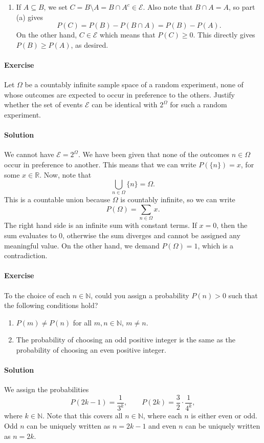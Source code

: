 \documentclass[10pt]{article}
\newcounter{prob}
\def\problem{\stepcounter{prob}\paragraph{Exercise \arabic{prob}}}
\def\solution{\paragraph{Solution}}
\begin{document}
\begin{enumerate}
                \item If $A \subseteq B$, we set $C = B \setminus A = B \cap A^c \in
                \mathcal{E}$.
                Also note that $B \cap A = A$, so part (a) gives \[
                        P(C) = P(B) - P(B \cap A) = P(B) - P(A).
                \] 
                On the other hand, $C \in \mathcal{E}$ which means that $P(C) \geq
                0$. This directly gives $P(B) \geq P(A)$, as desired.

        \end{enumerate}

        \problem Let $\Omega$ be a countably infinite sample space of a random
        experiment, none of whose outcomes are expected to occur in preference to
        the others. Justify whether the set of events $\mathcal{E}$ can be identical
        with $2^\Omega$ for such a random experiment.
        \solution We cannot have $\mathcal{E} = 2^\Omega$. We have been given that
        none of the outcomes $n \in \Omega$ occur in preference to another.
        This means that we can write $P(\{n\}) = x$, for some $x \in \mathbb{R}$.
        Now, note that \[
                \bigcup_{n \in \Omega} \{n\} = \Omega.
        \] This is a countable union because $\Omega$ is countably infinite, so we
        can write \[
                P(\Omega) = \sum_{n \in \Omega} x.
        \] The right hand side is an infinite sum with constant terms. If $x = 0$,
        then the sum evaluates to $0$, otherwise the sum diverges and cannot be
        assigned any meaningful value. On the other hand, we demand $P(\Omega) = 1$,
        which is a contradiction.

        \problem To the choice of each $n \in \mathbb{N}$, could you assign a 
        probability $P(n) > 0$ such that the following conditions hold?
        \begin{enumerate}
                \item $P(m) \neq P(n)$ for all $m, n \in \mathbb{N}$, $m \neq n$.
                \item The probability of choosing an odd positive integer is the
                same as the probability of choosing an even positive integer.
        \end{enumerate}
        \solution We assign the probabilities \[
                P(2k - 1) = \frac{1}{3^k}, \qquad 
                P(2k) = \frac{3}{2}\cdot\frac{1}{4^k},
        \] where $k \in \mathbb{N}$. Note that this covers all $n \in \mathbb{N}$,
        where each $n$ is either even or odd. Odd $n$ can be uniquely
        written as $n = 2k - 1$ and even $n$ can be uniquely written as $n = 2k$. \\
\end{document}
